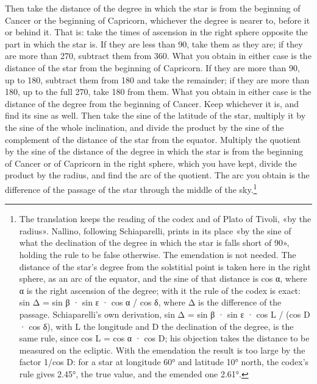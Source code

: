 \documentclass[11pt]{article}
\newcommand{\ArPage}[1]{\marginpar{\footnotesize\color{gray}Ar.\,p.\,#1}}
\begin{document}
\par \ArPage{48}Then take the distance of the degree in which the star is from the beginning of Cancer or the beginning of Capricorn, whichever the degree is nearer to, before it or behind it. That is: take the times of ascension in the right sphere opposite the part in which the star is. If they are less than 90, take them as they are; if they are more than 270, subtract them from 360. What you obtain in either case is the distance of the star from the beginning of Capricorn. If they are more than 90, up to 180, subtract them from 180 and take the remainder; if they are more than 180, up to the full 270, take 180 from them. What you obtain in either case is the distance of the degree from the beginning of Cancer. Keep whichever it is, and find its sine as well. Then take the sine of the latitude of the star, multiply it by the sine of the whole inclination, and divide the product by the sine of the complement of the distance of the star from the equator. Multiply the quotient by the sine of the distance of the degree in which the star is from the beginning of Cancer or of Capricorn in the right sphere, which you have kept, divide the product by the radius, and find the arc of the quotient. The arc you obtain is the difference of the passage of the star through the middle of the sky.\footnote{The translation keeps the reading of the codex and of Plato of Tivoli, «by the radius». Nallino, following Schiaparelli, prints in its place «by the sine of what the declination of the degree in which the star is falls short of 90», holding the rule to be false otherwise. The emendation is not needed. The distance of the star's degree from the solstitial point is taken here in the right sphere, as an arc of the equator, and the sine of that distance is cos α, where α is the right ascension of the degree; with it the rule of the codex is exact: sin Δ = sin β · sin ε · cos α / cos δ, where Δ is the difference of the passage. Schiaparelli's own derivation, sin Δ = sin β · sin ε · cos L / (cos D · cos δ), with L the longitude and D the declination of the degree, is the same rule, since cos L = cos α · cos D; his objection takes the distance to be measured on the ecliptic. With the emendation the result is too large by the factor 1/cos D: for a star at longitude 60° and latitude 10° north, the codex's rule gives 2.45°, the true value, and the emended one 2.61°.}\par
\end{document}
